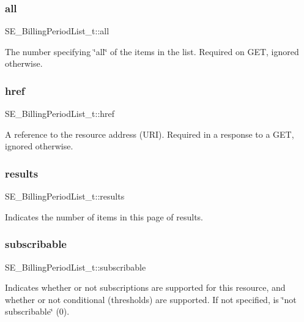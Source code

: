 \subsubsection{\texorpdfstring{all}{all}}
{\footnotesize\ttfamily S\+E\+\_\+\+Billing\+Period\+List\+\_\+t\+::all}

The number specifying \char`\"{}all\char`\"{} of the items in the list. Required on G\+ET, ignored otherwise. \mbox{\label{group__BillingPeriodList_ga25178fff55f503152774d69d8a90203d}} 
\subsubsection{\texorpdfstring{href}{href}}
{\footnotesize\ttfamily S\+E\+\_\+\+Billing\+Period\+List\+\_\+t\+::href}

A reference to the resource address (U\+RI). Required in a response to a G\+ET, ignored otherwise. \mbox{\label{group__BillingPeriodList_gadc844269764abba471b730d50aad225e}} 
\subsubsection{\texorpdfstring{results}{results}}
{\footnotesize\ttfamily S\+E\+\_\+\+Billing\+Period\+List\+\_\+t\+::results}

Indicates the number of items in this page of results. \mbox{\label{group__BillingPeriodList_ga8640613b3a337e43533d8476ab44133d}} 
\subsubsection{\texorpdfstring{subscribable}{subscribable}}
{\footnotesize\ttfamily S\+E\+\_\+\+Billing\+Period\+List\+\_\+t\+::subscribable}

Indicates whether or not subscriptions are supported for this resource, and whether or not conditional (thresholds) are supported. If not specified, is \char`\"{}not subscribable\char`\"{} (0). 